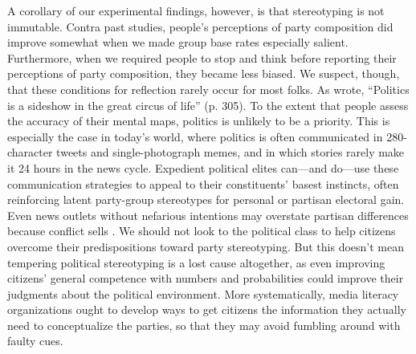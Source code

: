 \documentclass[12pt, letterpaper]{article}
\begin{document}
A corollary of our experimental findings, however, is that stereotyping is not immutable. Contra past studies, people's perceptions of party composition did improve somewhat when we made group base rates especially salient. Furthermore, when we required people to stop and think before reporting their perceptions of party composition, they became less biased. We suspect, though, that these conditions for reflection rarely occur for most folks. As \citet{Dahl1961} wrote, ``Politics is a sideshow in the great circus of life'' (p. 305). To the extent that people assess the accuracy of their mental maps, politics is unlikely to be a priority. This is especially the case in today's world, where politics is often communicated in 280-character tweets and single-photograph memes, and in which stories rarely make it 24 hours in the news cycle. Expedient political elites can---and do---use these communication strategies to appeal to their constituents' basest instincts, often reinforcing latent party-group stereotypes for personal or partisan electoral gain. %
Even news outlets without nefarious intentions may overstate partisan differences because conflict sells \citep{FiorinaAbramsPope2005,levendusky2016media}. We should not look to the political class to help citizens overcome their predispositions toward party stereotyping. But this doesn't mean tempering political stereotyping is a lost cause altogether, as even improving citizens' general competence with numbers and probabilities could improve their judgments about the political environment. More systematically, media literacy organizations ought to develop ways to get citizens the information they actually need to conceptualize the parties, so that they may avoid fumbling around with faulty cues. 
\end{document}

